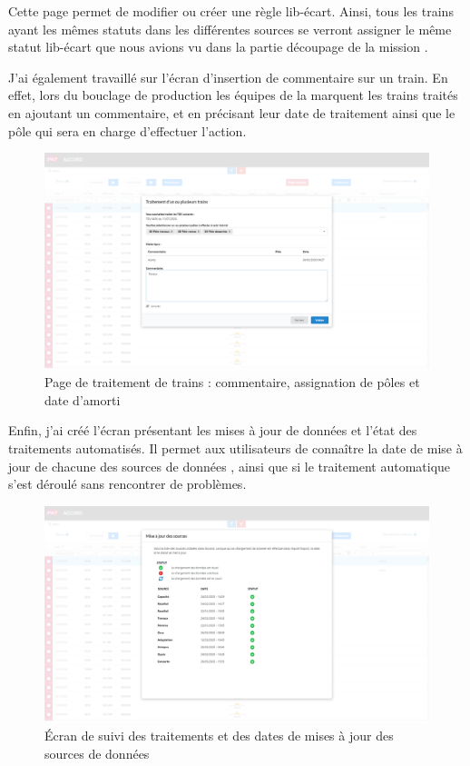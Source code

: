 Cette page permet de modifier ou créer une règle lib-écart. Ainsi, tous les trains ayant les mêmes statuts dans les différentes sources se verront assigner le même statut lib-écart que nous avions vu dans la partie \og découpage de la mission \fg.

J'ai également travaillé sur l'écran d'insertion de commentaire sur un train. En effet, lors du bouclage de production les équipes de la \sncf marquent les trains traités en ajoutant un commentaire, et en précisant leur date de traitement ainsi que le pôle qui sera en charge d'effectuer l'action.


  \begin{figure}[H]
    \centering
    \includegraphics[width=1\linewidth]{img/sycomores_commentaire.png}
    \caption{Page de traitement de trains : commentaire, assignation de pôles et date d'amorti}
  \end{figure}

Enfin, j'ai créé l'écran présentant les mises à jour de données et l'état des traitements automatisés. Il permet aux utilisateurs de connaître la date de mise à jour de chacune des sources de données \sncf, ainsi que si le traitement automatique s'est déroulé sans rencontrer de problèmes.


  \begin{figure}[H]
    \centering
    \includegraphics[width=1\linewidth]{img/sycomores_traitements.png}
    \caption{Écran de suivi des traitements et des dates de mises à jour des sources de données}
  \end{figure}

